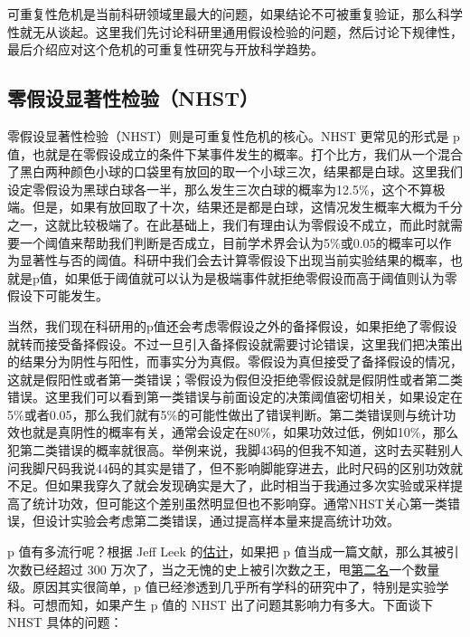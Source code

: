 \documentclass[]{tufte-book}
\begin{document}
可重复性危机是当前科研领域里最大的问题，如果结论不可被重复验证，那么科学性就无从谈起。这里我们先讨论科研里通用假设检验的问题，然后讨论下规律性，最后介绍应对这个危机的可重复性研究与开放科学趋势。

\hypertarget{ux96f6ux5047ux8bbeux663eux8457ux6027ux68c0ux9a8cnhst}{%
\subsection{零假设显著性检验（NHST）}\label{ux96f6ux5047ux8bbeux663eux8457ux6027ux68c0ux9a8cnhst}}

零假设显著性检验（NHST）则是可重复性危机的核心。NHST 更常见的形式是 p 值，也就是在零假设成立的条件下某事件发生的概率。打个比方，我们从一个混合了黑白两种颜色小球的口袋里有放回的取一个小球三次，结果都是白球。这里我们设定零假设为黑球白球各一半，那么发生三次白球的概率为12.5\%，这个不算极端。但是，如果有放回取了十次，结果还是都是白球，这情况发生概率大概为千分之一，这就比较极端了。在此基础上，我们有理由认为零假设不成立，而此时就需要一个阈值来帮助我们判断是否成立，目前学术界会认为5\%或0.05的概率可以作为显著性与否的阈值。科研中我们会去计算零假设下出现当前实验结果的概率，也就是p值，如果低于阈值就可以认为是极端事件就拒绝零假设而高于阈值则认为零假设下可能发生。

当然，我们现在科研用的p值还会考虑零假设之外的备择假设，如果拒绝了零假设就转而接受备择假设。不过一旦引入备择假设就需要讨论错误，这里我们把决策出的结果分为阴性与阳性，而事实分为真假。零假设为真但接受了备择假设的情况，这就是假阳性或者第一类错误；零假设为假但没拒绝零假设就是假阴性或者第二类错误。这里我们可以看到第一类错误与前面设定的决策阈值密切相关，如果设定在5\%或者0.05，那么我们就有5\%的可能性做出了错误判断。第二类错误则与统计功效也就是真阴性的概率有关，通常会设定在80\%，如果功效过低，例如10\%，那么犯第二类错误的概率就很高。举例来说，我脚43码的但我不知道，这时去买鞋别人问我脚尺码我说44码的其实是错了，但不影响脚能穿进去，此时尺码的区别功效就不足。但如果我穿久了就会发现确实是大了，此时相当于我通过多次实验或采样提高了统计功效，但可能这个差别虽然明显但也不影响穿。通常NHST关心第一类错误，但设计实验会考虑第二类错误，通过提高样本量来提高统计功效。

p 值有多流行呢？根据 Jeff Leek 的\href{https://docs.google.com/presentation/d/1hzdSDaPPSE9xUYZHhOVfQIRPPdwe0A9SdE7QDsK3bOA/edit\#slide=id.g255a5ace66_3_796}{估计}，如果把 p 值当成一篇文献，那么其被引次数已经超过 300 万次了，当之无愧的史上被引次数之王，甩\href{http://www.nature.com/news/the-top-100-papers-1.16224}{第二名}一个数量级。原因其实很简单，p 值已经渗透到几乎所有学科的研究中了，特别是实验学科。可想而知，如果产生 p 值的 NHST 出了问题其影响力有多大。下面谈下 NHST 具体的问题：
\end{document}

